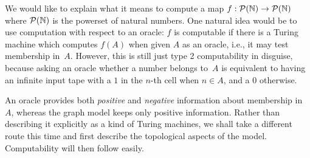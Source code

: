 We would like to explain what it means to compute a map $f : \mathcal{P}(\mathbb{N})
\to \mathcal{P}(\mathbb{N})$ where $\mathcal{P}(\mathbb{N})$ is the powerset of natural numbers.
One natural idea would be to use computation with respect to an
oracle: $f$ is computable if there is a Turing machine which computes
$f(A)$ when given $A$ as an oracle, i.e., it may test membership
in~$A$. However, this is still just type 2 computability in disguise,
because asking an oracle whether a number belongs to~$A$ is equivalent
to having an infinite input tape with a $1$ in the $n$-th cell when $n
\in A$, and a $0$ otherwise.

An oracle provides both \emph{positive} and \emph{negative}
information about membership in~$A$, whereas the graph model keeps
only positive information. Rather than describing it explicitly as a
kind of Turing machines, we shall take a different route this time and
first describe the topological aspects of the model. Computability
will then follow easily.

